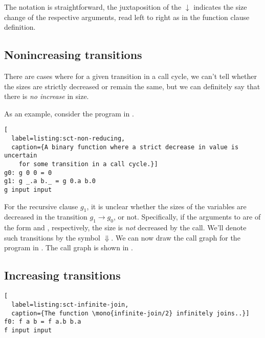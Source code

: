 

The notation is straightforward, the juxtaposition of the $\downarrow$
indicates the size change of the respective arguments, read left to right as in
the function clause definition.

\subsection{Nonincreasing transitions}

There are cases where for a given transition in a call cycle, we can't tell
whether the sizes are strictly decreased or remain the same, but we can
definitely say that there is \emph{no increase} in size.

As an example, consider the program in .

\begin{lstlisting}[
  label=listing:sct-non-reducing,
  caption={A binary function where a strict decrease in value is uncertain
    for some transition in a call cycle.}]
g0: g 0 0 = 0
g1: g _.a b._ = g 0.a b.0
g input input
\end{lstlisting}


For the recursive clause $g_1$, it is unclear whether
the sizes of the variables are decreased in the transition $g_1\rightarrow g_0$, or not.
Specifically, if the arguments to  are of the form  and
, respectively, the size is \emph{not} decreased by the call. We'll
denote such transitions by the symbol $\Downarrow$. We can now draw the call
graph for the program in . The call graph is
shown in .



\subsection{Increasing transitions}




\begin{lstlisting}[
  label=listing:sct-infinite-join,
  caption={The function \mono{infinite-join/2} infinitely joins..}]
f0: f a b = f a.b b.a
f input input
\end{lstlisting}



